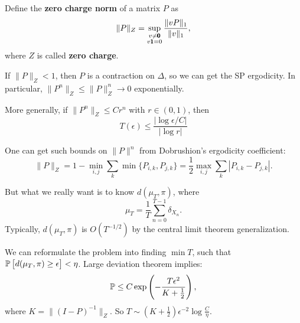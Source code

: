 \begin{definition}
    Define the \textbf{zero charge norm} of a matrix $P$ as 
    \begin{equation*}
        \| P \|_Z = \sup_{\substack{v \neq \pmb{0} \\ v \pmb{1} = 0}} \frac{\|vP\|_1}{\|v\|_1},
    \end{equation*}
    where $Z$ is called \textbf{zero charge}.
\end{definition}

\begin{remark}
    If $\| P \|_Z < 1$, then $P$ is a contraction on $\Delta$, so we can get the SP ergodicity. In particular, $\|P^n\|_Z \le \|P\|^n_Z \to 0$ exponentially.

    More generally, if $\|P^n\|_Z \le Cr^n$ with $r \in (0,1)$, then 
    \begin{equation*}
        T(\epsilon) \le \frac{| \log \epsilon/C |}{|\log r|}
    \end{equation*}
\end{remark}

\begin{remark}
    One can get such bounds on $\|P\|^n$ from Dobrushion's ergodicity coefficient: 
    \begin{equation*}
        \| P \|_Z = 1 - \min_{i,j} \sum_{k} \min \{P_{i,k}, P_{j,k}\} = \frac{1}{2} \max_{i,j} \sum_k |P_{i,k} - P_{j,k}|.
    \end{equation*}
\end{remark}

But what we really want is to know $d(\mu_T, \pi)$, where
\begin{equation*}
    \mu_T = \frac{1}{T} \sum_{n = 0}^{T-1} \delta_{X_n}.
\end{equation*}
Typically, $d(\mu_T, \pi)$ is $O(T^{-1/2})$ by the central limit theorem generalization. 

We can reformulate the problem into finding $\min T$, such that $\mathbb{P} \left[ d(\mu_T, \pi) \ge \epsilon \right] < \eta$. Large deviation theorem implies: 
\begin{equation*}
    \mathbb{P} \le C \exp \left( - \frac{T \epsilon^2}{K+\frac{1}{2}} \right),
\end{equation*}
where $K = \|(I-P)^{-1}\|_Z$. So $T \sim (K+\frac{1}{2})\epsilon^{-2}\log\frac{C}{\eta}$.
